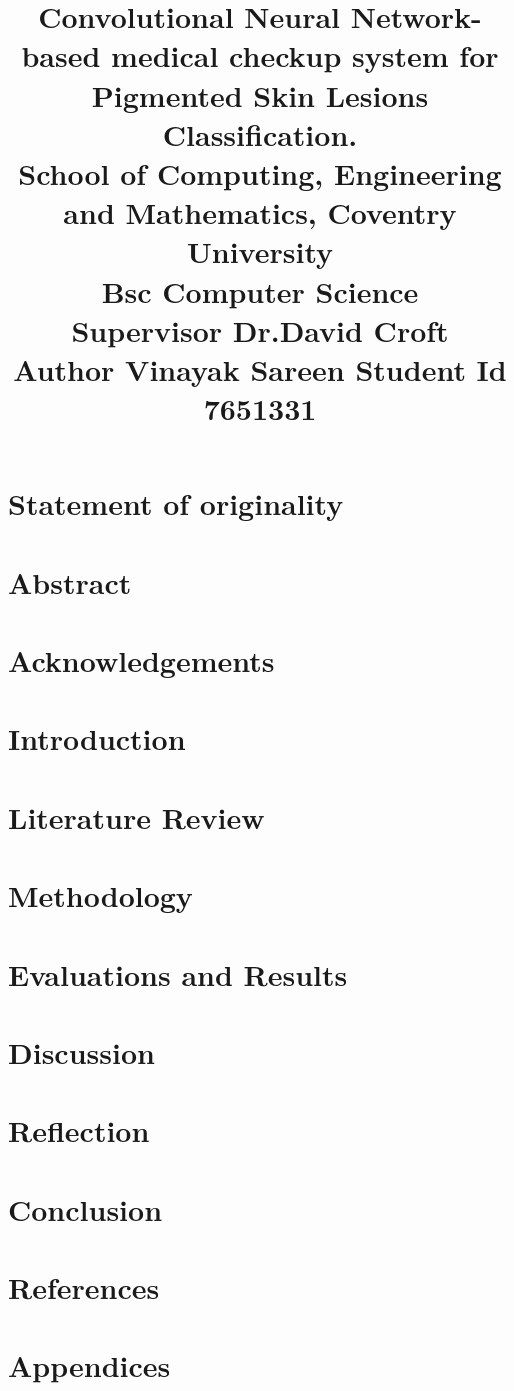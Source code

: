 \documentclass[12pt]{report}
\title{
	{Convolutional Neural Network-based medical checkup system for Pigmented Skin Lesions Classification.} \\
	\vspace{5mm} %
	{\large School of Computing, Engineering and Mathematics, Coventry University} \\
	\vspace{3mm} %
	{\large Bsc Computer Science}\\
	{\large Supervisor Dr.David Croft}\\
	{\large Author Vinayak Sareen}
	{\large Student Id 7651331}
}
\date{}
\begin{document}
\maketitle

\chapter*{Statement of originality}
\tableofcontents

\chapter*{Abstract}


\chapter*{Acknowledgements}


\chapter{Introduction}



\chapter{Literature Review}


\chapter{Methodology}


\chapter{Evaluations and Results}


\chapter{Discussion}


\chapter{Reflection}


\chapter{Conclusion}


\chapter*{References}


\chapter*{Appendices}

\end{document}
